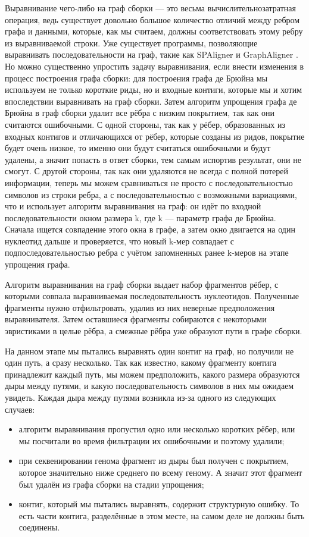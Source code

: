 \documentclass[14pt]{matmex-diploma-custom}
\begin{document}
Выравнивание чего-либо на граф сборки --- это весьма вычислительнозатратная операция, ведь существует довольно большое количество отличий между ребром графа и данными, которые, как мы считаем, должны соответствовать этому ребру из выравниваемой строки. Уже существует программы, позволяющие выравнивать последовательности на граф, такие как SPAligner \cite{art:spaligner} и GraphAligner \cite{art:graphaligner}. Но можно существенно упростить задачу выравнивания, если внести изменения в процесс построения графа сборки: для построения графа де Брюйна мы используем не только короткие риды, но и входные контиги, которые мы и хотим впоследствии выравнивать на граф сборки. Затем алгоритм упрощения графа де Брюйна в граф сборки удалит все рёбра с низким покрытием, так как они считаются ошибочными. С одной стороны, так как у рёбер, образованных из входных контигов и отличающихся от рёбер, которые созданы из ридов, покрытие будет очень низкое, то именно они будут считаться ошибочными и будут удалены, а значит попасть в ответ сборки, тем самым испортив результат, они не смогут. С другой стороны, так как они удаляются не всегда с полной потерей информации, теперь мы можем сравниваться не просто с последовательностью символов из строки ребра, а с последовательностью с возможными вариациями, что и использует алгоритм выравнивания на граф: он идёт по входной последовательности окном размера k, где k --- параметр графа де Брюйна. Сначала ищется совпадение этого окна в графе, а затем окно двигается на один нуклеотид дальше и проверяется, что новый k-мер совпадает с подпоследовательностью ребра с учётом запомненных ранее k-меров на этапе упрощения графа. 

Алгоритм выравнивания на граф сборки выдает набор фрагментов рёбер, с которыми совпала выравниваемая последовательность нуклеотидов. Полученные фрагменты нужно отфильтровать, удалив из них неверные предположения выравнивателя. Затем оставшиеся фрагменты собираются с некоторыми эвристиками в целые рёбра, а смежные рёбра уже образуют пути в графе сборки.

На данном этапе мы пытались выравнять один контиг на граф, но получили не один путь, а сразу несколько. Так как известно, какому фрагменту контига принадлежит каждый путь, мы можем предположить, какого размера образуются дыры между путями, и какую последовательность символов в них мы ожидаем увидеть. Каждая дыра между путями возникла из-за одного из следующих случаев:
\begin{itemize}
	\item алгоритм выравнивания пропустил одно или несколько коротких рёбер, или мы посчитали во время фильтрации их ошибочными и поэтому удалили;
	\item при секвенировании генома фрагмент из дыры был получен с покрытием, которое значительно ниже среднего по всему геному. А значит этот фрагмент был удалён из графа сборки на стадии упрощения;
	\item контиг, который мы пытались выравнять, содержит структурную ошибку. То есть части контига, разделённые в этом месте, на самом деле не должны быть соединены.
\end{itemize}
\end{document}
